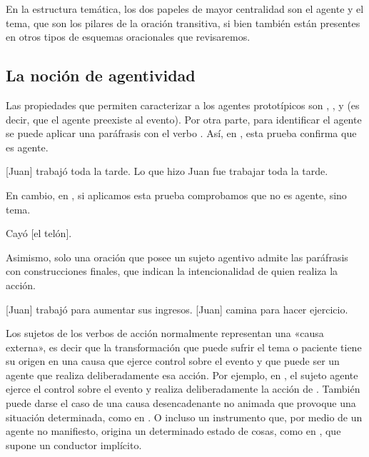 En la estructura temática, los dos papeles de mayor centralidad son el agente y
el tema, que son los pilares de la oración transitiva, si bien también están
presentes en otros tipos de esquemas oracionales que revisaremos.

\subsection{La noción de agentividad}\label{sec:07-agentividad}

Las propiedades que permiten caracterizar a los agentes prototípicos son
, ,  y  (es decir, que el agente
preexiste al evento). Por otra parte, para identificar el agente se puede
aplicar una paráfrasis con el verbo . Así, en ,
esta prueba confirma que  es agente.

\begin{exe}
  \ex\label{ex:07-juan}
    \begin{xlist}
      \ex {}[Juan] trabajó toda la tarde.
      \ex Lo que hizo Juan fue trabajar toda la tarde.
    \end{xlist}
\end{exe}

En cambio, en , si aplicamos esta prueba comprobamos que
 no es agente, sino tema.

\begin{exe}
  \ex\label{ex:07-telon}
    \begin{xlist}
      \ex Cayó [el telón].
    \end{xlist}
\end{exe}

Asimismo, solo una oración que posee un sujeto agentivo admite las paráfrasis
con construcciones finales, que indican la intencionalidad de quien realiza la
acción.

\begin{exe}
  \ex {}[Juan] trabajó para aumentar sus ingresos.
  \ex {}[Juan] camina para hacer ejercicio.
\end{exe}

Los sujetos de los verbos de acción normalmente representan una «causa
externa», es decir que la transformación que puede sufrir el tema o paciente
tiene su origen en una causa que ejerce control sobre el evento y que puede ser
un agente que realiza deliberadamente esa acción. Por ejemplo, en , el sujeto agente ejerce el control sobre el evento
y realiza deliberadamente la acción de . También puede
darse el caso de una causa desencadenante no animada que provoque una situación
determinada, como en . O incluso un
instrumento que, por medio de un agente no manifiesto, origina un determinado
estado de cosas, como en , que
supone un conductor implícito.

